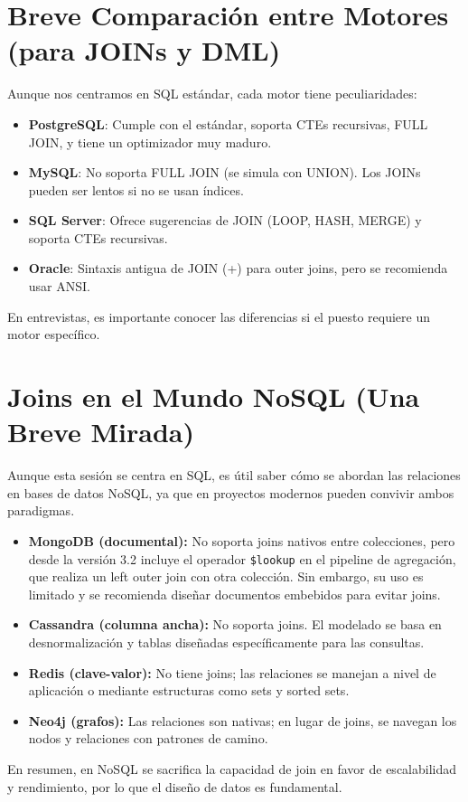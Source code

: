 \documentclass[12pt,a4paper,openany,oneside]{book}
\begin{document}
\chapter{Breve Comparación entre Motores (para JOINs y DML)}
Aunque nos centramos en SQL estándar, cada motor tiene peculiaridades:
\begin{itemize}
    \item \textbf{PostgreSQL}: Cumple con el estándar, soporta CTEs recursivas, FULL JOIN, y tiene un optimizador muy maduro.
    \item \textbf{MySQL}: No soporta FULL JOIN (se simula con UNION). Los JOINs pueden ser lentos si no se usan índices.
    \item \textbf{SQL Server}: Ofrece sugerencias de JOIN (LOOP, HASH, MERGE) y soporta CTEs recursivas.
    \item \textbf{Oracle}: Sintaxis antigua de JOIN (+) para outer joins, pero se recomienda usar ANSI.
\end{itemize}
En entrevistas, es importante conocer las diferencias si el puesto requiere un motor específico.



\chapter{Joins en el Mundo NoSQL (Una Breve Mirada)}
Aunque esta sesión se centra en SQL, es útil saber cómo se abordan las relaciones en bases de datos NoSQL, ya que en proyectos modernos pueden convivir ambos paradigmas.

\begin{itemize}
    \item \textbf{MongoDB (documental):} No soporta joins nativos entre colecciones, pero desde la versión 3.2 incluye el operador \texttt{\$lookup} en el pipeline de agregación, que realiza un left outer join con otra colección. Sin embargo, su uso es limitado y se recomienda diseñar documentos embebidos para evitar joins.
    \item \textbf{Cassandra (columna ancha):} No soporta joins. El modelado se basa en desnormalización y tablas diseñadas específicamente para las consultas.
    \item \textbf{Redis (clave-valor):} No tiene joins; las relaciones se manejan a nivel de aplicación o mediante estructuras como sets y sorted sets.
    \item \textbf{Neo4j (grafos):} Las relaciones son nativas; en lugar de joins, se navegan los nodos y relaciones con patrones de camino.
\end{itemize}
En resumen, en NoSQL se sacrifica la capacidad de join en favor de escalabilidad y rendimiento, por lo que el diseño de datos es fundamental.
\end{document}
